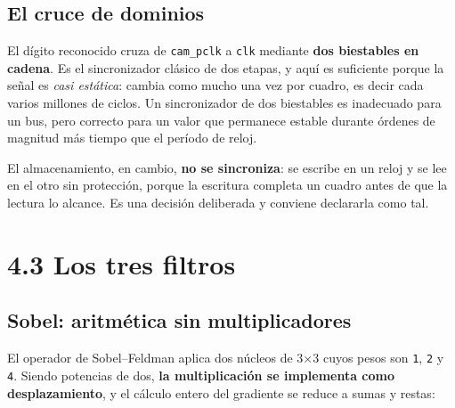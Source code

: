 \subsection{El cruce de dominios}\label{el-cruce-de-dominios}

El dígito reconocido cruza de \texttt{cam\_pclk} a \texttt{clk} mediante
\textbf{dos biestables en cadena}. Es el sincronizador clásico de dos
etapas, y aquí es suficiente porque la señal es \emph{casi estática}:
cambia como mucho una vez por cuadro, es decir cada varios millones de
ciclos. Un sincronizador de dos biestables es inadecuado para un bus,
pero correcto para un valor que permanece estable durante órdenes de
magnitud más tiempo que el período de reloj.

El almacenamiento, en cambio, \textbf{no se sincroniza}: se escribe en
un reloj y se lee en el otro sin protección, porque la escritura
completa un cuadro antes de que la lectura lo alcance. Es una decisión
deliberada y conviene declararla como tal.

\section{4.3 Los tres filtros}\label{los-tres-filtros}

\subsection{Sobel: aritmética sin
multiplicadores}\label{sobel-aritmuxe9tica-sin-multiplicadores}

El operador de Sobel--Feldman aplica dos núcleos de 3×3 cuyos pesos son
\texttt{1}, \texttt{2} y \texttt{4}. Siendo potencias de dos, \textbf{la
multiplicación se implementa como desplazamiento}, y el cálculo entero
del gradiente se reduce a sumas y restas:

\begin{Shaded}
\begin{Highlighting}[]
 \OperatorTok{[}\OperatorTok{:}\OperatorTok{]}\OperatorTok{=}\OperatorTok{+} \OperatorTok{(}\OperatorTok{\textless{}\textless{}}\OperatorTok{)} \OperatorTok{+}\OperatorTok{;}
 \OperatorTok{[}\OperatorTok{:}\OperatorTok{]}\OperatorTok{=}\OperatorTok{+} \OperatorTok{(}\OperatorTok{\textless{}\textless{}}\OperatorTok{)} \OperatorTok{+}\OperatorTok{;}
 \OperatorTok{[}\OperatorTok{:}\OperatorTok{]}\OperatorTok{=}\OperatorTok{+} \OperatorTok{(}\OperatorTok{\textless{}\textless{}}\OperatorTok{)} \OperatorTok{+}\OperatorTok{;}
 \OperatorTok{[}\OperatorTok{:}\OperatorTok{]}\OperatorTok{=}\OperatorTok{+} \OperatorTok{(}\OperatorTok{\textless{}\textless{}}\OperatorTok{)} \OperatorTok{+}\OperatorTok{;}
\end{Highlighting}
\end{Shaded}

